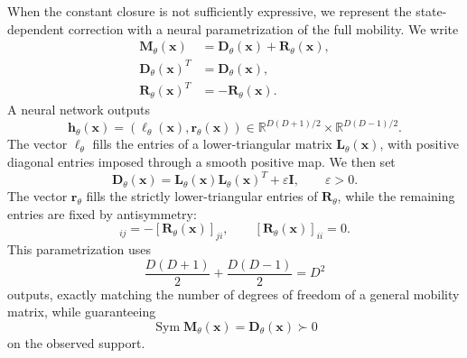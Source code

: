 \documentclass[11pt,twoside,fleqn]{article}
\begin{document}
When the constant closure is not sufficiently expressive, we represent the state-dependent correction with a neural parametrization of the full mobility. We write
\begin{equation}
\begin{aligned}
    \bm{M}_\theta(\bm{x})
    &=
    \bm{D}_\theta(\bm{x})
    +
    \bm{R}_\theta(\bm{x}),
    \\
    \bm{D}_\theta(\bm{x})^T
    &=
    \bm{D}_\theta(\bm{x}),
    \\
    \bm{R}_\theta(\bm{x})^T
    &=
    -\bm{R}_\theta(\bm{x}).
\end{aligned}
    \label{eq:neural_M_DR_parametrization}
\end{equation}
A neural network outputs
\begin{equation}
    \bm{h}_\theta(\bm{x})
    =
    \left(
        \bm{\ell}_\theta(\bm{x}),
        \bm{r}_\theta(\bm{x})
    \right)
    \in
    \mathbb{R}^{D(D+1)/2}
    \times
    \mathbb{R}^{D(D-1)/2}.
    \label{eq:neural_output_split}
\end{equation}
The vector $\bm{\ell}_\theta$ fills the entries of a lower-triangular matrix
$\bm{L}_\theta(\bm{x})$, with positive diagonal entries imposed through a smooth positive map. We then set
\begin{equation}
    \bm{D}_\theta(\bm{x})
    =
    \bm{L}_\theta(\bm{x})
    \bm{L}_\theta(\bm{x})^T
    +
    \varepsilon\bm{I},
    \qquad
    \varepsilon>0.
    \label{eq:neural_D_psd_parametrization}
\end{equation}
The vector $\bm{r}_\theta$ fills the strictly lower-triangular entries of
$\bm{R}_\theta$, while the remaining entries are fixed by antisymmetry:
\begin{equation}
    [\bm{R}_\theta(\bm{x})]_{ij}
    =
    -
    [\bm{R}_\theta(\bm{x})]_{ji},
    \qquad
    [\bm{R}_\theta(\bm{x})]_{ii}=0 .
    \label{eq:neural_R_minimal_parametrization}
\end{equation}
This parametrization uses
\begin{equation}
    \frac{D(D+1)}{2}
    +
    \frac{D(D-1)}{2}
    =
    D^2
\end{equation}
outputs, exactly matching the number of degrees of freedom of a general mobility matrix, while guaranteeing
\begin{equation}
    \operatorname{Sym}\bm{M}_\theta(\bm{x})
    =
    \bm{D}_\theta(\bm{x})
    \succ 0
\end{equation}
on the observed support.
\end{document}
